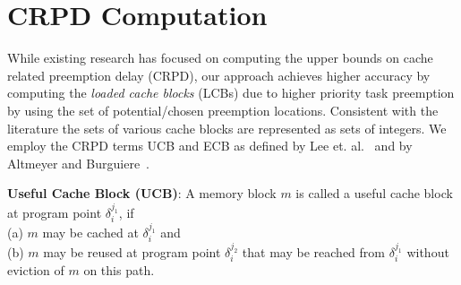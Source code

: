 \section{CRPD Computation}\label{sec:crpd_computation}

While existing research has focused on computing the upper bounds on cache related preemption delay (CRPD), our approach achieves higher accuracy by computing the \emph{loaded cache blocks} (LCBs) due to higher priority task preemption by using the set of potential/chosen preemption locations.  Consistent with the literature the sets of various cache blocks are represented as sets of integers.  We employ the CRPD terms UCB and ECB as defined by Lee et. al.~\cite{lee:98} and by Altmeyer and Burguiere~\cite{altmeyer:11c}.

\begin{definition}
\textbf{Useful Cache Block (UCB)}: A memory block $m$ is called a useful cache block at program point \begin{math}\delta_{i}^{j_{1}}\end{math}, if \\(a) $m$ may be cached at \begin{math}\delta_{i}^{j_{1}}\end{math} and \\(b) $m$ may be reused at program point \begin{math}\delta_{i}^{j_{2}}\end{math} that may be reached from \begin{math}\delta_{i}^{j_{1}}\end{math} without eviction of $m$ on this path.
\end{definition}

